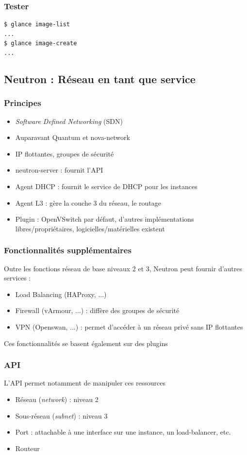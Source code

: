   \begin{frame}[containsverbatim]
    \frametitle{Tester}
\begin{verbatim}
$ glance image-list
...
$ glance image-create
...
\end{verbatim}
  \end{frame}

  \subsection[Neutron]{Neutron : Réseau en tant que service}

  \begin{frame}
    \frametitle{Principes}
    \begin{itemize}
      \item \textit{Software Defined Networking} (SDN)
      \item Auparavant Quantum et nova-network
      \item IP flottantes, groupes de sécurité
      \item neutron-server : fournit l'API
      \item Agent DHCP : fournit le service de DHCP pour les instances
      \item Agent L3 : gère la couche 3 du réseau, le routage
      \item Plugin : OpenVSwitch par défaut, d'autres implémentations libres/propriétaires, logicielles/matérielles existent
    \end{itemize}
  \end{frame}

  \begin{frame}
    \frametitle{Fonctionnalités supplémentaires}
    Outre les fonctions réseau de base niveaux 2 et 3, Neutron peut fournir d'autres services :
    \begin{itemize}
      \item Load Balancing (HAProxy, ...)
      \item Firewall (vArmour, ...) : diffère des groupes de sécurité
      \item VPN (Openswan, ...) : permet d'accéder à un réseau privé sans IP flottantes
    \end{itemize}
    Ces fonctionnalités se basent également sur des plugins
  \end{frame}

  \begin{frame}
    \frametitle{API}
    L'API permet notamment de manipuler ces ressources
    \begin{itemize}
      \item Réseau (\textit{network}) : niveau 2
      \item Sous-réseau (\textit{subnet}) : niveau 3
      \item Port : attachable à une interface sur une instance, un load-balancer, etc.
      \item Routeur
    \end{itemize}
  \end{frame}

